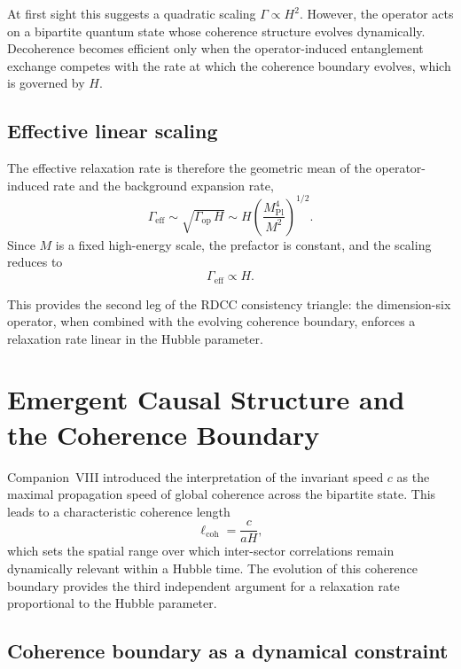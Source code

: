 \documentclass[11pt,a4paper]{article}
\begin{document}
At first sight this suggests a quadratic scaling $\Gamma \propto H^{2}$. However, the
operator acts on a bipartite quantum state whose coherence structure evolves
dynamically. Decoherence becomes efficient only when the operator-induced entanglement
exchange competes with the rate at which the coherence boundary evolves, which is
governed by $H$.

\subsection{Effective linear scaling}

The effective relaxation rate is therefore the geometric mean of the operator-induced
rate and the background expansion rate,
\begin{equation}
    \Gamma_{\mathrm{eff}}
    \sim \sqrt{\Gamma_{\mathrm{op}}\, H}
    \sim H \left( \frac{M_{\mathrm{Pl}}^{4}}{M^{2}} \right)^{1/2}.
\end{equation}
Since $M$ is a fixed high-energy scale, the prefactor is constant, and the scaling reduces
to
\begin{equation}
    \Gamma_{\mathrm{eff}} \propto H.
\end{equation}

This provides the second leg of the RDCC consistency triangle: the dimension-six
operator, when combined with the evolving coherence boundary, enforces a relaxation
rate linear in the Hubble parameter.

\section{Emergent Causal Structure and the Coherence Boundary}

Companion~VIII introduced the interpretation of the invariant speed $c$ as the maximal
propagation speed of global coherence across the bipartite state. This leads to a
characteristic coherence length
\begin{equation}
    \ell_{\mathrm{coh}} = \frac{c}{aH},
\end{equation}
which sets the spatial range over which inter-sector correlations remain dynamically
relevant within a Hubble time. The evolution of this coherence boundary provides the
third independent argument for a relaxation rate proportional to the Hubble parameter.

\subsection{Coherence boundary as a dynamical constraint}
\end{document}
